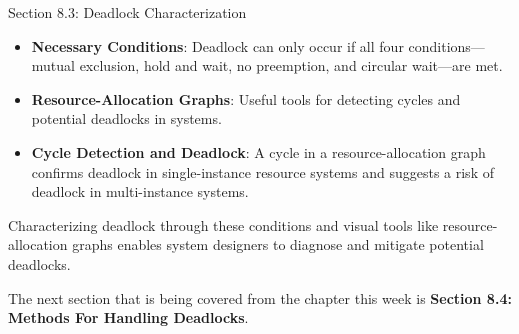 \begin{notes}{Section 8.3: Deadlock Characterization}
\begin{highlight}
    \end{highlight}
    
    \begin{highlight}
    
        \begin{itemize}
            \item \textbf{Necessary Conditions}: Deadlock can only occur if all four conditions—mutual exclusion, hold and wait, no preemption, and circular wait—are met.
            \item \textbf{Resource-Allocation Graphs}: Useful tools for detecting cycles and potential deadlocks in systems.
            \item \textbf{Cycle Detection and Deadlock}: A cycle in a resource-allocation graph confirms deadlock in single-instance resource systems and suggests a risk of deadlock in multi-instance systems.
        \end{itemize}
    
    Characterizing deadlock through these conditions and visual tools like resource-allocation graphs enables system designers to diagnose and mitigate potential deadlocks.
    
    \end{highlight}
\end{notes}

The next section that is being covered from the chapter this week is \textbf{Section 8.4: Methods For Handling Deadlocks}.

